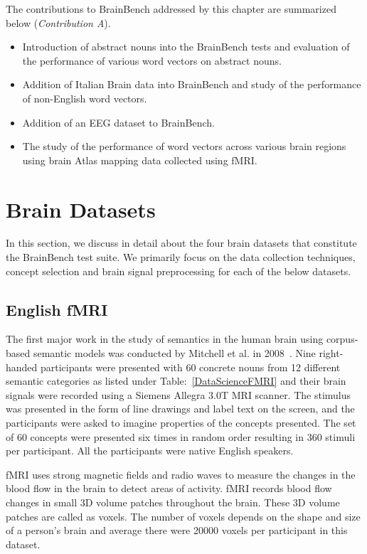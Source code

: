 The contributions to BrainBench addressed by this chapter are summarized below (\textit{Contribution A}).

\begin{itemize}

\item {Introduction of abstract nouns into the BrainBench tests and evaluation of the performance of various word vectors on abstract nouns.}
\item{Addition of Italian Brain data into BrainBench and study of the performance of non-English word vectors.}
\item {Addition of an EEG dataset to BrainBench.}
\item {The study of the performance of word vectors across various brain regions using brain Atlas mapping data collected using fMRI.}
\end{itemize}

\section{Brain Datasets}
In this section, we discuss in detail about the four brain datasets that constitute the  BrainBench test suite. We primarily focus on the data collection techniques, concept selection and brain signal preprocessing for each of the below datasets.

\subsection{English fMRI}

The first major work in the study of semantics in the human brain using corpus-based semantic models was conducted by Mitchell et al. in 2008~\cite{Mitchell1191}. Nine right-handed participants were presented with 60 concrete nouns from 12 different semantic categories as listed under Table:~\ref{DataScienceFMRI} and their brain signals were recorded using a Siemens  Allegra 3.0T MRI scanner. The stimulus was presented in the form of line drawings and label text on the screen, and the participants were asked to imagine properties of the concepts presented. The set of 60 concepts were presented six times in random order resulting in 360 stimuli per participant. All the participants were native English speakers.

fMRI uses strong magnetic fields and radio waves to measure the changes in the blood flow in the brain to detect areas of activity. fMRI records blood flow changes in small 3D volume patches throughout the brain. These 3D volume patches are called as voxels. The number of voxels depends on the shape and size of a person's brain and average there were 20000 voxels per participant in this dataset. 

